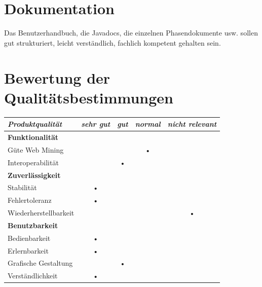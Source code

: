 \documentclass[10pt]{scrreprt}
\begin{document}
\section{Dokumentation}
Das Benutzerhandbuch, die Javadocs, die einzelnen Phasendokumente usw. sollen gut strukturiert, leicht verständlich, fachlich kompetent gehalten sein. 


\section{Bewertung der Qualitätsbestimmungen}
\begin{center}
\begin{tabular}{lcccc}
\hline 
\rule[-1ex]{0pt}{4ex} \textit{Produktqualität} & \textit{sehr gut} & \textit{gut} & \textit{normal} & \textit{nicht relevant} \\ 
\hline 
\rule[-1ex]{0pt}{4ex} \textbf{Funktionalität} &  &  &  &  \\ 
\rule[-1ex]{0pt}{4ex} \hspace{10pt} Güte Web Mining & &  & • & \\ 
\rule[-1ex]{0pt}{4ex} \hspace{10pt} Interoperabilität & & • & & \\ 

\hline 
\rule[-1ex]{0pt}{4ex} \textbf{Zuverlässigkeit} &  &  &  &  \\ 
\rule[-1ex]{0pt}{4ex} \hspace{10pt} Stabilität & • & & & \\ 
\rule[-1ex]{0pt}{4ex} \hspace{10pt} Fehlertoleranz & • & & & \\ 
\rule[-1ex]{0pt}{4ex} \hspace{10pt} Wiederherstellbarkeit &  &  &  & • \\ 

\hline 
\rule[-1ex]{0pt}{4ex} \textbf{Benutzbarkeit} &  &  &  &  \\ 
\rule[-1ex]{0pt}{4ex} \hspace{10pt} Bedienbarkeit & • & & & \\ 
\rule[-1ex]{0pt}{4ex} \hspace{10pt} Erlernbarkeit & • & & & \\ 
\rule[-1ex]{0pt}{4ex} \hspace{10pt} Grafische Gestaltung & & • & & \\ 
\rule[-1ex]{0pt}{4ex} \hspace{10pt} Verständlichkeit & • & & & \\ 


\end{tabular}
\end{center}
\end{document}

